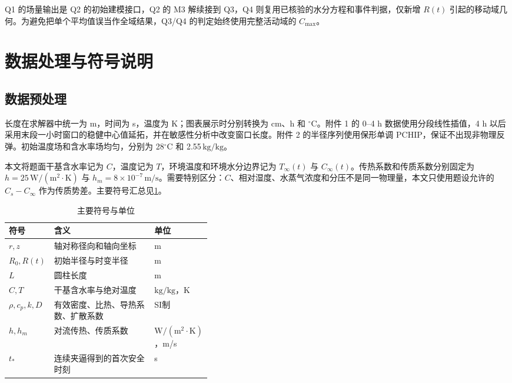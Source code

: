 \documentclass[withoutpreface,bwprint]{cumcmthesis}
\newcommand{\kgkg}{\ensuremath{\mathrm{kg/kg}}}
\newcommand{\Cmax}{C_{\max}}
\newcommand{\Rtime}{R(t)}
\begin{document}
Q1 的场量输出是 Q2 的初始建模接口，Q2 的 M3 解续接到 Q3，Q4 则复用已核验的水分方程和事件判据，仅新增 \(R(t)\) 引起的移动域几何。为避免把单个平均值误当作全域结果，Q3/Q4 的判定始终使用完整活动域的 \(\Cmax\)。

\section{数据处理与符号说明}

\subsection{数据预处理}

长度在求解器中统一为 m，时间为 s，温度为 K；图表展示时分别转换为 cm、h 和 \(^{\circ}\mathrm C\)。附件 1 的 0--4 h 数据使用分段线性插值，4 h 以后采用末段一小时窗口的稳健中心值延拓，并在敏感性分析中改变窗口长度。附件 2 的半径序列使用保形单调 PCHIP，保证不出现非物理反弹。初始温度场和含水率场均匀，分别为 28\(^{\circ}\mathrm C\) 和 2.55\,\kgkg。

本文将题面干基含水率记为 \(C\)，温度记为 \(T\)，环境温度和环境水分边界记为 \(T_\infty(t)\) 与 \(C_\infty(t)\)。传热系数和传质系数分别固定为 \(h=25\,\mathrm{W/(m^2\cdot K)}\) 与 \(h_m=8\times10^{-7}\,\mathrm{m/s}\)。需要特别区分：\(C\)、相对湿度、水蒸气浓度和分压不是同一物理量，本文只使用题设允许的 \(C_s-C_\infty\) 作为传质势差。主要符号汇总见\cref{tab:symbols}。

\begin{table}[H]
\centering
\caption{主要符号与单位}
\label{tab:symbols}
\begin{tabularx}{0.95\linewidth}{>{\centering\arraybackslash}p{0.18\linewidth}X>{\centering\arraybackslash}p{0.22\linewidth}}
\toprule
符号 & 含义 & 单位\\
\midrule
\(r,z\) & 轴对称径向和轴向坐标 & m\\
\(R_0,\Rtime\) & 初始半径与时变半径 & m\\
\(L\) & 圆柱长度 & m\\
\(C,T\) & 干基含水率与绝对温度 & \(\kgkg\)，K\\
\(\rho,c_p,k,D\) & 有效密度、比热、导热系数、扩散系数 & SI制\\
\(h,h_m\) & 对流传热、传质系数 & \(\mathrm{W/(m^2\cdot K)}\)，m/s\\
\(t_*\) & 连续夹逼得到的首次安全时刻 & s\\
\bottomrule
\end{tabularx}
\end{table}
\end{document}

